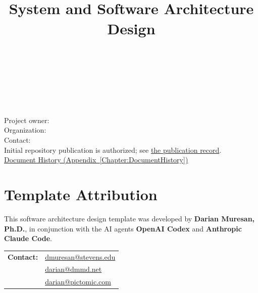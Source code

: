 \title{\ProjectName\\[0.5em]\large System and Software Architecture Design\\[1.5em]\normalsize\VERSION\\\DocumentStatus}
\author{\DocumentOwner\\\Organization\\\href{mailto:\DocumentEmail}{\DocumentEmail}}
\conferraldate{}{\DocumentDate}
\copyrightholder{\DocumentOwner}
\maketitle

\begin{copyrightpage}
Project owner: \DocumentOwner \\
Organization: \Organization \\
Contact: \href{mailto:\DocumentEmail}{\DocumentEmail} \\
Initial repository publication is authorized; see \hyperref[Section:InitializationPublication]{the publication record}. \\[0.2in]
\hyperref[Chapter:DocumentHistory]{Document History (Appendix~\ref*{Chapter:DocumentHistory})}
\end{copyrightpage}

\cleardoublepage
{}
\chapter*{Template Attribution}

This software architecture design template was developed by
\textbf{Darian Muresan, Ph.D.}, in conjunction with the AI agents
\textbf{OpenAI Codex} and \textbf{Anthropic Claude Code}.

\begin{tabularx}{\linewidth}{@{}L{3.0cm}Y@{}}
\textbf{Contact:} & \href{mailto:dmuresan@stevens.edu}{dmuresan@stevens.edu}\\
& \href{mailto:darian@dmmd.net}{darian@dmmd.net}\\
& \href{mailto:darian@pictomic.com}{darian@pictomic.com}
\end{tabularx}

\clearpage
\begin{abstract}
  
\end{abstract}

\contentspage
\tablelistpage
\figurelistpage
